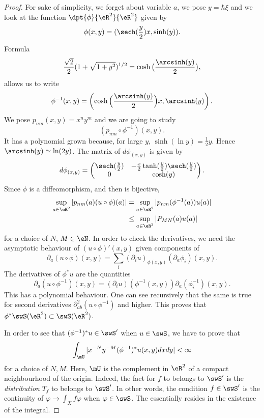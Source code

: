 \begin{proof}
For sake of simplicity, we forget about variable $a$, we pose $y=\hbar \xi$ and we look at the function $\dpt{\phi}{\eR^2}{\eR^2}$ given by
\[ 
  \phi(x,y)=(\sech(\frac{y}{2})x,\sinh(y)).
\]
Formula
\[ 
  \frac{\sqrt{2}}{2}(1+\sqrt{1+y^2})^{1/2}=\cosh\big( \frac{\arcsinh(y)}{2} \big),
\]
allows us to write
\begin{equation}
\phi^{-1}(x,y)=\left( \cosh\Big( \frac{\arcsinh(y)}{2} \Big)x,\arcsinh(y) \right).
\end{equation}
We pose $p_{nm}(x,y)=x^ny^m$ and we are going to study 
\[ 
  (p_{nm}\circ\phi^{-1})(x,y).
\]
It has a polynomial grown because, for large $y$, $\sinh(\ln y)=\frac{1}{2} y$. Hence $\arcsinh(y)\simeq \ln(2 y)$. The matrix of $d\phi_{(x,y)}$ is given by
\begin{equation}
d\phi_{(x,y)}=
\begin{pmatrix}
\sech(\frac{y}{2}) & -\frac{x}{2}\tanh(\frac{y}{2})\sech(\frac{y}{2})\\
0                  &   \cosh(y)
\end{pmatrix}.
\end{equation}
Since $\phi$ is a diffeomorphism, and then is bijective,
\begin{equation}
\begin{split}
  \sup_{a\in\eR^2}| p_{nm}(a)(u\circ \phi)(a) |&=\sup_{a\in\eR^2}| p_{nm}(\phi^{-1}(a))u(a) |\\
                                               &\leq \sup_{a\in\eR^2}| P_{MN}(a)u(a) |
\end{split}
\end{equation}
for a choice of $N$, $M\in\eN$. In order to check the derivatives, we need the asymptotic behaviour of $(u\circ\phi)'(x,y)$ given components of
\[ 
  \partial_a(u\circ\phi)(x,y)=\sum_i(\partial_iu)_{\phi(x,y)}(\partial_a\phi_i)(x,y).
\]
The derivatives of $\phi^*u$ are the quantities
\[ 
  \partial_a(u\circ\phi^{-1})(x,y)=(\partial_iu)(\phi^{-1}(x,y))\partial_a(\phi_i^{-1})(x,y).
\]
This has a polynomial behaviour. One can see recursively that the same is true for second derivatives $\partial^2_{ab}(u\circ\phi^{-1})$ and higher. This proves that $\phi^*\swS(\eR^2)\subset\swS(\eR^2)$.

In order to see that $(\phi^{-1})^*u\in\swS'$ when $u\in\swS$, we have to prove that
\begin{equation} \label{eq:r1181205}
  \int_{\mU}| x^{-N}y^{-M}(\phi^{-1})^*u(x,y)dxdy |<\infty
\end{equation}
for a choice of $N,M$. Here, $\mU$ is the complement in $\eR^2$ of a compact neighbourhood of the origin. Indeed, the fact for $f$ to belongs to $\swS'$ is the \emph{distribution} $T_f$ to belongs to $\swS'$. In other words, the condition $f\in\swS'$ is the continuity of $\varphi\to\int_X f\varphi$ when $\varphi\in\swS$. The essentially resides in the existence of the integral.


\end{proof}
